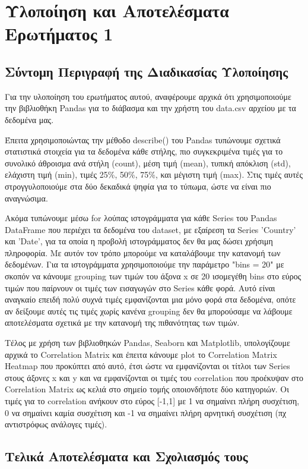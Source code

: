 \documentclass[12pt,a4paper]{article}
\begin{document}
\section{Υλοποίηση και Αποτελέσματα Ερωτήματος 1}

\subsection{Σύντομη Περιγραφή της Διαδικασίας Υλοποίησης}

Για την υλοποίηση του ερωτήματος αυτού, αναφέρουμε αρχικά ότι χρησιμοποιούμε την βιβλιοθήκη Pandas για το διάβασμα και την χρήστη του data.csv αρχείου με τα δεδομένα μας.

Έπειτα χρησιμοποιώντας την μέθοδο describe() του Pandas τυπώνουμε σχετικά στατιστικά στοιχεία για τα δεδομένα κάθε στήλης, πιο συγκεκριμένα τιμές για το συνολικό άθροισμα ανά στήλη (count), μέση τιμή (mean), τυπική απόκλιση (std), ελάχιστη τιμή (min), τιμές 25\%, 50\%, 75\%, και μέγιστη τιμή (max). Στις τιμές αυτές στρογγυλοποιούμε στα δύο δεκαδικά ψηφία για το τύπωμα, ώστε να είναι πιο αναγνώσιμα. 

Ακόμα τυπώνουμε μέσω for λούπας ιστογράμματα για κάθε Series του Pandas DataFrame που περιέχει τα δεδομένα του dataset, με εξαίρεση τα Series 'Country' και 'Date', για τα οποία η προβολή ιστογράμματος δεν θα μας δώσει χρήσιμη πληροφορία. Με αυτόν τον τρόπο μπορούμε να καταλάβουμε την κατανομή των δεδομένων. Για τα ιστογράμματα χρησιμοποιούμε την παράμετρο "bins = 20" με σκοπόν να κάνουμε grouping των τιμών του άξονα x σε 20 ισομεγέθη bins στο εύρος τιμών που παίρνουν οι τιμές των εισαγωγών στο Series κάθε φορά. Αυτό είναι αναγκαίο επειδή πολύ συχνά τιμές εμφανίζονται μια μόνο φορά στα δεδομένα, οπότε αν δείξουμε αυτές τις τιμές χωρίς κανένα grouping δεν θα μπορούσαμε να λάβουμε αποτελέσματα σχετικά με την κατανομή της πιθανότητας των τιμών.

Τέλος με χρήση των βιβλιοθηκών Pandas, Seaborn και Matplotlib, υπολογίζουμε αρχικά το Correlation Matrix και έπειτα κάνουμε plot το Correlation Matrix Heatmap που προκύπτει από αυτό, έτσι ώστε να εμφανίζονται οι τίτλοι των Series στους άξονες x και y και να εμφανίζονται οι τιμές του correlation που προέκυψαν στο Correlation Matrix ως κελιά στο σημείο τομής οποιονδήποτε δύο κατηγοριών. Οι τιμές για το correlation ανήκουν στο εύρος [-1,1] με 1 να σημαίνει πλήρη συσχέτιση, 0 να σημαίνει καμία συσχέτιση και -1 να σημαίνει πλήρη αρνητική συσχέτιση (πχ αντιστρόφως ανάλογες τιμές).

\subsection{Τελικά Αποτελέσματα και Σχολιασμός τους}
\end{document}
